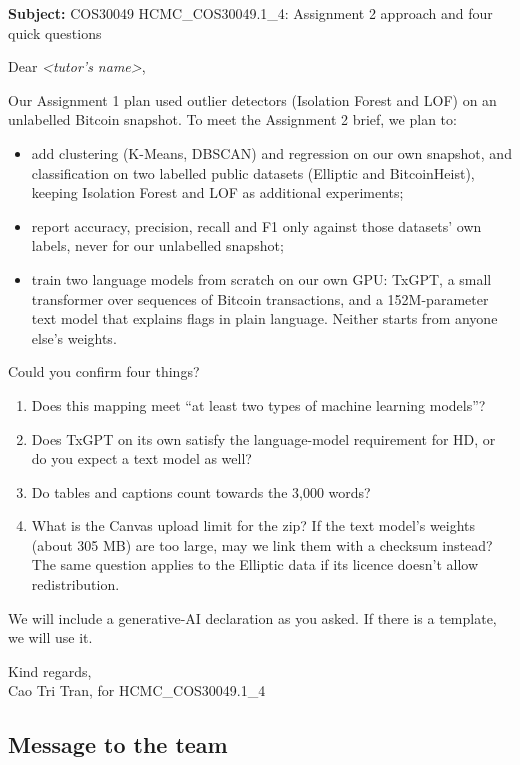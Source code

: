 \begin{summarybox}
\small
\textbf{Subject:} COS30049 HCMC\_COS30049.1\_4: Assignment 2 approach and four quick questions

Dear \textit{<tutor's name>},

Our Assignment 1 plan used outlier detectors (Isolation Forest and LOF) on an unlabelled Bitcoin
snapshot. To meet the Assignment 2 brief, we plan to:
\begin{itemize}[leftmargin=*]
  \item add clustering (K-Means, DBSCAN) and regression on our own snapshot, and classification on
    two labelled public datasets (Elliptic and BitcoinHeist), keeping Isolation Forest and LOF as
    additional experiments;
  \item report accuracy, precision, recall and F1 only against those datasets' own labels, never
    for our unlabelled snapshot;
  \item train two language models from scratch on our own GPU: TxGPT, a small transformer over
    sequences of Bitcoin transactions, and a 152M-parameter text model that explains flags in
    plain language. Neither starts from anyone else's weights.
\end{itemize}

Could you confirm four things?
\begin{enumerate}[leftmargin=*]
  \item Does this mapping meet ``at least two types of machine learning models''?
  \item Does TxGPT on its own satisfy the language-model requirement for HD, or do you expect a
    text model as well?
  \item Do tables and captions count towards the 3,000 words?
  \item What is the Canvas upload limit for the zip? If the text model's weights (about 305 MB)
    are too large, may we link them with a checksum instead? The same question applies to the
    Elliptic data if its licence doesn't allow redistribution.
\end{enumerate}

We will include a generative-AI declaration as you asked. If there is a template, we will use it.

Kind regards,\\
Cao Tri Tran, for HCMC\_COS30049.1\_4
\end{summarybox}

\subsection{Message to the team}

